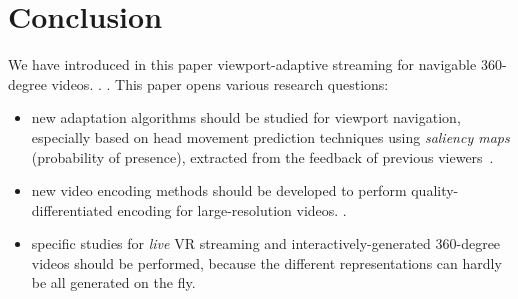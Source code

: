 \section{Conclusion}
\label{sec:conclusion}

We have introduced in this paper viewport-adaptive streaming for
navigable 360-degree videos. .
. This
paper opens various research questions:
\begin{itemize}
  \item new adaptation algorithms should be studied for viewport navigation,
especially based on head movement prediction techniques using \emph{saliency maps} (probability of
presence), extracted from the feedback of
previous viewers~\cite{han2014spatial}.

  \item new video encoding methods should be
developed to perform quality-differentiated encoding for
large-resolution videos. .
\item specific studies for \emph{live} \ac{VR} streaming
and interactively-generated 360-degree videos should be performed,
because the different representations can hardly be all
generated on the fly.
\end{itemize}
